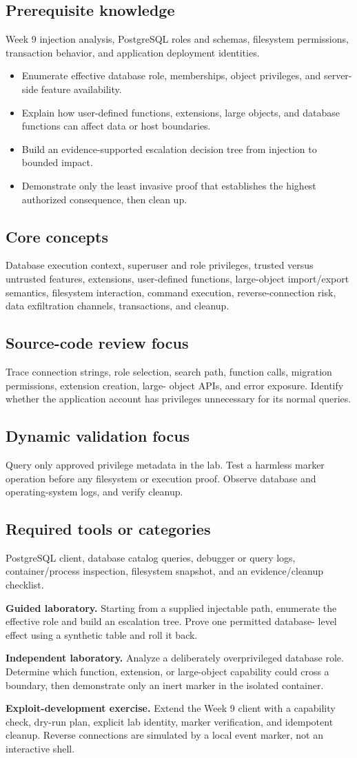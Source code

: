 \documentclass[11pt]{article}
\newcommand{\weekfield}[2]{%
  \Needspace{5\baselineskip}
  \subsection*{#1}
  #2
}
\begin{document}
\weekfield{Prerequisite knowledge}{Week 9 injection analysis, PostgreSQL roles
and schemas, filesystem permissions, transaction behavior, and application
deployment identities.}

\begin{objectivebox}
\begin{itemize}
  \item Enumerate effective database role, memberships, object privileges, and server-side feature availability.
  \item Explain how user-defined functions, extensions, large objects, and database functions can affect data or host boundaries.
  \item Build an evidence-supported escalation decision tree from injection to bounded impact.
  \item Demonstrate only the least invasive proof that establishes the highest authorized consequence, then clean up.
\end{itemize}
\end{objectivebox}

\weekfield{Core concepts}{Database execution context, superuser and role
privileges, trusted versus untrusted features, extensions, user-defined functions,
large-object import/export semantics, filesystem interaction, command execution,
reverse-connection risk, data exfiltration channels, transactions, and cleanup.}

\weekfield{Source-code review focus}{Trace connection strings, role selection,
search path, function calls, migration permissions, extension creation, large-
object APIs, and error exposure. Identify whether the application account has
privileges unnecessary for its normal queries.}

\weekfield{Dynamic validation focus}{Query only approved privilege metadata in
the lab. Test a harmless marker operation before any filesystem or execution
proof. Observe database and operating-system logs, and verify cleanup.}

\weekfield{Required tools or categories}{PostgreSQL client, database catalog
queries, debugger or query logs, container/process inspection, filesystem
snapshot, and an evidence/cleanup checklist.}

\begin{labbox}
\textbf{Guided laboratory.} Starting from a supplied injectable path, enumerate
the effective role and build an escalation tree. Prove one permitted database-
level effect using a synthetic table and roll it back.

\textbf{Independent laboratory.} Analyze a deliberately overprivileged database
role. Determine which function, extension, or large-object capability could cross
a boundary, then demonstrate only an inert marker in the isolated container.

\textbf{Exploit-development exercise.} Extend the Week 9 client with a capability
check, dry-run plan, explicit lab identity, marker verification, and idempotent
cleanup. Reverse connections are simulated by a local event marker, not an
interactive shell.
\end{labbox}
\end{document}
